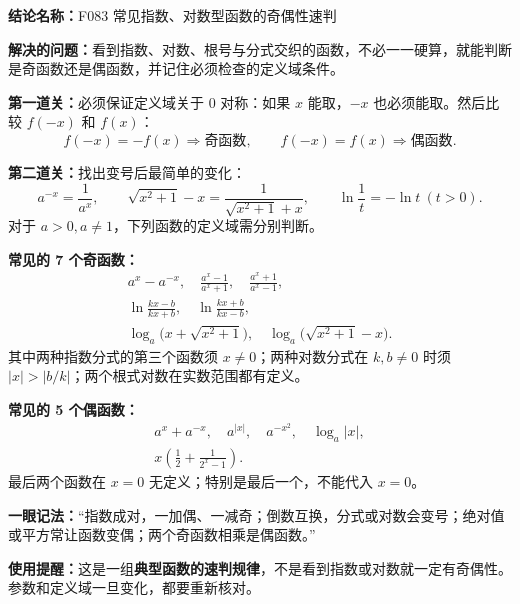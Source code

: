 \textbf{结论名称：}F083 常见指数、对数型函数的奇偶性速判

\textbf{解决的问题：}看到指数、对数、根号与分式交织的函数，不必一一硬算，就能判断是奇函数还是偶函数，并记住必须检查的定义域条件。

\textbf{第一道关：}必须保证定义域关于 $0$ 对称：如果 $x$ 能取，$-x$ 也必须能取。然后比较 $f(-x)$ 和 $f(x)$：
\[
\boxed{f(-x)=-f(x)\Rightarrow\text{奇函数}},\qquad
\boxed{f(-x)=f(x)\Rightarrow\text{偶函数}}.
\]

\textbf{第二道关：}找出变号后最简单的变化：
\[
a^{-x}=\frac1{a^x},\qquad
\sqrt{x^2+1}-x=\frac1{\sqrt{x^2+1}+x},\qquad
\ln\frac1t=-\ln t\ (t>0).
\]
对于 $a>0,a\ne1$，下列函数的定义域需分别判断。

\textbf{常见的 7 个奇函数：}
\[
\begin{gathered}
 a^x-a^{-x},\quad \frac{a^x-1}{a^x+1},\quad \frac{a^x+1}{a^x-1},\\
 \ln\frac{kx-b}{kx+b},\quad \ln\frac{kx+b}{kx-b},\\
 \log_a\!\bigl(x+\sqrt{x^2+1}\bigr),\quad
 \log_a\!\bigl(\sqrt{x^2+1}-x\bigr).
\end{gathered}
\]
其中两种指数分式的第三个函数须 $x\ne0$；两种对数分式在 $k,b\ne0$ 时须 $|x|>|b/k|$；两个根式对数在实数范围都有定义。

\textbf{常见的 5 个偶函数：}
\[
\begin{gathered}
 a^x+a^{-x},\quad a^{|x|},\quad a^{-x^2},\quad \log_a|x|,\\
 x\left(\frac12+\frac1{2^x-1}\right).
\end{gathered}
\]
最后两个函数在 $x=0$ 无定义；特别是最后一个，不能代入 $x=0$。

\textbf{一眼记法：}“指数成对，一加偶、一减奇；倒数互换，分式或对数会变号；绝对值或平方常让函数变偶；两个奇函数相乘是偶函数。”

\textbf{使用提醒：}这是一组\textbf{典型函数的速判规律}，不是看到指数或对数就一定有奇偶性。参数和定义域一旦变化，都要重新核对。
